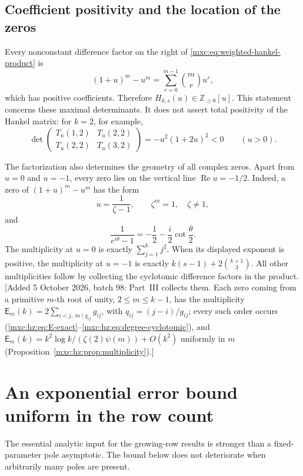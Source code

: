 \documentclass[11pt]{article}
\numberwithin{equation}{section}
\theoremstyle{definition}
\theoremstyle{remark}
\begin{document}
\subsection{Coefficient positivity and the location of the zeros}

Every nonconstant difference factor on the right of
\eqref{mxc:eq:weighted-hankel-product} is
\[
 (1+u)^m-u^m=\sum_{r=0}^{m-1}\binom mr u^r,
\]
which has positive coefficients.  Therefore
$H_{k,s}(u)\in\mathbb Z_{\geq0}[u]$.
This statement concerns these maximal determinants.  It does not
assert total positivity of the Hankel matrix: for $k=2$, for example,
\[
 \det\begin{pmatrix}T_u(1,2)&T_u(2,2)\\
                      T_u(2,2)&T_u(3,2)\end{pmatrix}
 =-u^2(1+2u)^2<0\qquad(u>0).
\]

The factorization also determines the geometry of all complex zeros.
Apart from $u=0$ and $u=-1$, every zero lies on the vertical line
$\operatorname{Re}u=-1/2$.  Indeed, a zero of
$(1+u)^m-u^m$ has the form
\[
 u=\frac{1}{\zeta-1},\qquad \zeta^m=1,\quad\zeta\ne1,
\]
and
\[
 \frac1{e^{i\theta}-1}
 =-\frac12-\frac{i}{2}\cot\frac\theta2.
\]
The multiplicity at $u=0$ is exactly $\sum_{j=1}^{k}j^2$.
When its displayed exponent is positive, the multiplicity at $u=-1$
is exactly $k(s-1)+2\binom{k+1}{3}$.  All other multiplicities follow
by collecting the cyclotomic difference factors in the product.
[Added 5 October 2026, batch 98: Part~III collects them. Each zero coming
from a primitive $m$-th root of unity, $2\le m\le k-1$, has the multiplicity
$\mathsf E_m(k)=2\sum_{i<j,\ m\mid q_{ij}}g_{ij}$, with
$q_{ij}=(j-i)/g_{ij}$; every such order occurs
(\eqref{mxc:hz:eq:E-exact}--\eqref{mxc:hz:eq:degree-cyclotomic}), and
$\mathsf E_m(k)=k^2\log k/(\zeta(2)\psi(m))+O(k^2)$ uniformly in $m$
(Proposition~\ref{mxc:hz:prop:multiplicity}).]



\section{An exponential error bound uniform in the row count}\label{mxc:sec:uniform}

The essential analytic input for the growing-row results is stronger than
a fixed-parameter pole asymptotic. The bound below does not deteriorate
when arbitrarily many poles are present.
\end{document}
